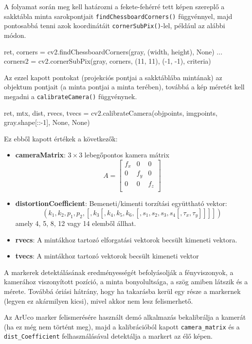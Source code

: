 A folyamat során meg kell határozni a fekete-fehérré tett képen szereplő a sakktábla minta sarokpontjait
\texttt{findChessboardCorners()} függvénnyel, majd pontosabbá tenni azok koordinátáit
\texttt{cornerSubPix()}-lel, például az alábbi módon.
\begin{python}
ret, corners = cv2.findChessboardCorners(gray, (width, height), None)
...
corners2 = cv2.cornerSubPix(gray, corners, (11, 11), (-1, -1), criteria)
\end{python}
Az ezzel kapott pontokat (projekciós pontjai a sakktáblába mintának) az objektum pontjait (a minta pontjai a minta terében), továbbá a kép méretét kell megadni a \texttt{calibrateCamera()} függvénynek.
\begin{python}
ret, mtx, dist, rvecs, tvecs = cv2.calibrateCamera(objpoints,
  imgpoints, gray.shape[::-1], None, None)
\end{python}
Ez ebből kapott értékek a következők:
\begin{itemize}
\item {\bf cameraMatrix}: $3 \times 3$ lebegőpontos kamera mátrix
\[
A =
\begin{bmatrix}
	f_x & 0 & 0 \\
	0 & f_y & 0 \\
	0 & 0 & f_z \\
\end{bmatrix}
\]

\item {\bf distortionCoefficient}: Bemeneti/kimenti torzítási együttható vektor:
\[
(k_1, k_2, p_1, p_2, [, k_3 [, k_4, k_5, k_6, [, s_1, s_2, s_3, s_4 [, \tau_x, \tau_y]]]])
\]
amely 4, 5, 8, 12 vagy 14 elemből állhat.

\item {\bf rvecs}: A mintákhoz tartozó elforgatási vektorok becsült kimeneti vektora.

\item {\bf tvecs}: A mintákhoz tartozó vektorok becsült kimeneti vektor
\end{itemize}


A markerek detektálásának eredményességét befolyásolják a fényviszonyok, a kamerához viszonyított pozíció, a minta bonyolultsága, a szög amiben látszik és a mérete. Továbbá óriási hátrány, hogy ha takarásba kerül egy része a markernek (legyen ez akármilyen kicsi), mivel akkor nem lesz felismerhető.

Az ArUco marker felismerésére használt demó alkalmazás bekalibrálja a kamerát (ha ez még nem történt meg), majd a kalibrációból kapott \texttt{camera\_matrix} és a \texttt{dist\_Coefficient} felhasználásával detektálja a markert az élő képen.

